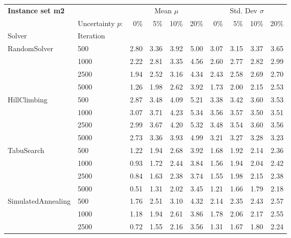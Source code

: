 \vspace*{-25px}
\begin{figure}[H]
\end{figure}

{\footnotesize
\begin{longtable}{ll|rrrr|rrrr}
\toprule
\textbf{Instance set m2}                 & {} & \multicolumn{4}{c|}{Mean $\mu$} & \multicolumn{4}{c}{Std. Dev $\sigma$} \\
                & Uncertainty $p$: & 0\% & 5\% & 10\% & 20\% & 0\% & 5\% & 10\% & 20\% \\
Solver & Iteration &      &      &      &      &      &      &      &      \\
\midrule
RandomSolver & 500  & 2.80 & 3.36 & 3.92 & 5.00 & 3.07 & 3.15 & 3.37 & 3.65 \\
                 & 1000 & 2.22 & 2.81 & 3.35 & 4.56 & 2.60 & 2.77 & 2.82 & 2.99 \\
                 & 2500 & 1.94 & 2.52 & 3.16 & 4.34 & 2.43 & 2.58 & 2.69 & 2.70 \\
                 & 5000 & 1.26 & 1.98 & 2.62 & 3.92 & 1.73 & 2.00 & 2.15 & 2.53 \\ \hline
HillClimbing & 500  & 2.87 & 3.48 & 4.09 & 5.21 & 3.38 & 3.42 & 3.60 & 3.53 \\
                 & 1000 & 3.07 & 3.71 & 4.23 & 5.34 & 3.56 & 3.57 & 3.50 & 3.51 \\
                 & 2500 & 2.99 & 3.67 & 4.20 & 5.32 & 3.48 & 3.54 & 3.60 & 3.56 \\
                 & 5000 & 2.73 & 3.36 & 3.93 & 4.99 & 3.21 & 3.27 & 3.28 & 3.23 \\ \hline
TabuSearch & 500  & 1.22 & 1.94 & 2.68 & 3.92 & 1.68 & 1.92 & 2.14 & 2.36 \\
                 & 1000 & 0.93 & 1.72 & 2.44 & 3.84 & 1.56 & 1.94 & 2.04 & 2.42 \\
                 & 2500 & 0.84 & 1.63 & 2.38 & 3.74 & 1.55 & 1.98 & 2.15 & 2.38 \\
                 & 5000 & 0.51 & 1.31 & 2.02 & 3.45 & 1.21 & 1.66 & 1.79 & 2.18 \\ \hline
SimulatedAnnealing & 500  & 1.76 & 2.51 & 3.10 & 4.32 & 2.14 & 2.35 & 2.43 & 2.57 \\
                 & 1000 & 1.18 & 1.94 & 2.61 & 3.86 & 1.78 & 2.06 & 2.17 & 2.55 \\
                 & 2500 & 0.72 & 1.55 & 2.16 & 3.56 & 1.31 & 1.67 & 1.80 & 2.24 \\

\end{longtable}}

